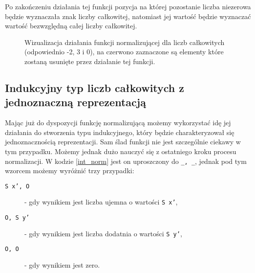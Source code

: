 Po zakończeniu działania tej funkcji pozycja na której pozostanie liczba niezerowa będzie wyznaczała znak liczby całkowitej, natomiast jej wartość będzie wyznaczać wartość bezwzględną całej liczby całkowitej.
\begin{figure}[!htp]
    \centering

    \hspace{1cm}
    \hspace{1cm}

    \caption{Wizualizacja działania funkcji normalizującej dla liczb całkowitych (odpowiednio -2, 3 i 0), na czerwono zaznaczone są elementy które zostaną usunięte przez działanie tej funkcji.}
    \label{fig:int_norm}
\end{figure}
\subsection{Indukcyjny typ liczb całkowitych z jednoznaczną reprezentacją}
Mając już do dyspozycji funkcję normalizującą możemy wykorzystać idę jej działania do stworzenia typu indukcyjnego, który będzie charakteryzował się jednoznacznością reprezentacji. Sam ślad funkcji nie jest szczególnie ciekawy w tym przypadku. Możemy jednak dużo nauczyć się z ostatniego kroku procesu normalizacji. W kodzie \ref{int_norm} jest on uproszczony do \texttt{_, _}, jednak pod tym wzorcem możemy wyróżnić trzy przypadki:
\begin{description}
    \item[\texttt{S x', O}] - gdy wynikiem jest liczba ujemna o wartości \texttt{S x'},
    \item[\texttt{O, S y'}] - gdy wynikiem jest liczba dodatnia o wartości \texttt{S y'},
    \item[\texttt{O, O}] - gdy wynikiem jest zero.
\end{description}

